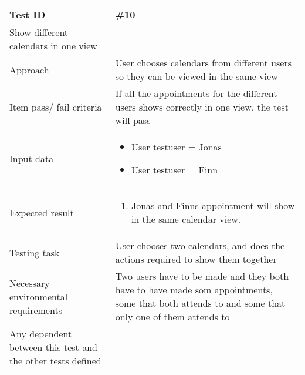 \documentclass[a4paper, 10pt]{article}
\begin{document}
\begin{tabularx}{\textwidth}{ |X|X| }
\hline
\rowcolor{Gray}
Test ID & \#10 \\ \hline
Show different calendars in one view\\ \hline
Approach & User chooses calendars from different users so they can be viewed in the same view \\ \hline
Item pass/ fail criteria & If all the appointments for the different users shows correctly in one view, the test will pass\\ \hline
Input data &
\begin{itemize}
\item User testuser = Jonas
\item User testuser = Finn
\end{itemize}\\ \hline
Expected result &
\begin{enumerate}
\item Jonas and Finns appointment will show in the same calendar view.
\end{enumerate} \\ \hline
Testing task & User chooses two calendars, and does the actions required to show them together \\ \hline
Necessary environmental requirements & Two users have to be made and they both have to have made som appointments, some that both attends to and some that only one of them attends to\\ \hline
Any dependent between this test and the other tests defined & #2, #3, #7, #10\\ \hline


\end{tabularx}
\end{document}
